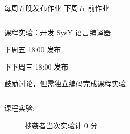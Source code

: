 \begin{frame}{}
  \begin{center}
    每周五晚发布作业 \qquad 下周五  前作业
  \end{center}

  \begin{columns}
    \vspace{-0.80cm}
    \begin{center}
    \end{center}
  \end{columns}
\end{frame}

\begin{frame}{}
  \begin{center}
    课程实验：开发 \href{https://compiler.educg.net/}{\textsf{SysY}} 语言编译器


    \vspace{0.30cm}
  \end{center}
\end{frame}

\begin{frame}{}
  \begin{center}
      下周五 18:00 发布 \\[5pt]

    \vspace{0.10cm}

    \pause
    \vspace{0.10cm}
      下下周三 18:00 发布 \\[5pt]
  \end{center}
\end{frame}

\begin{frame}
  \begin{center}
    鼓励讨论，但需独立编码完成课程实验
  \end{center}

  \pause
  \begin{columns}
    \begin{description}
      \item[课程实验:] 抄袭者当次实验计 $0$ 分
    \end{description}
  \end{columns}
\end{frame}

